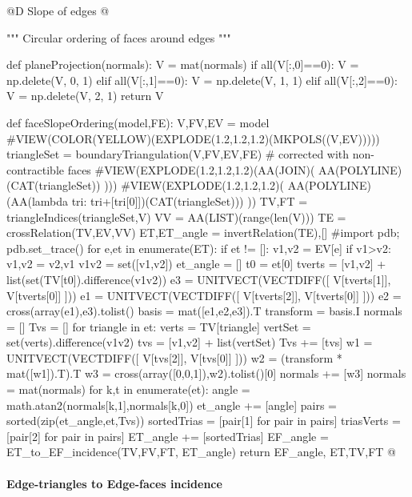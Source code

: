 \documentclass[11pt,oneside]{article}    %
\begin{document}
@D Slope of edges
@{""" Circular ordering of faces around edges """

def planeProjection(normals):
    V = mat(normals)
    if all(V[:,0]==0): V = np.delete(V, 0, 1)
    elif all(V[:,1]==0): V = np.delete(V, 1, 1)
    elif all(V[:,2]==0): V = np.delete(V, 2, 1)
    return V

def faceSlopeOrdering(model,FE):
    V,FV,EV = model
    #VIEW(COLOR(YELLOW)(EXPLODE(1.2,1.2,1.2)(MKPOLS((V,EV)))))
    triangleSet = boundaryTriangulation(V,FV,EV,FE) # corrected with non-contractible faces
    #VIEW(EXPLODE(1.2,1.2,1.2)(AA(JOIN)( AA(POLYLINE)(CAT(triangleSet)) )))
    #VIEW(EXPLODE(1.2,1.2,1.2)( AA(POLYLINE)(AA(lambda tri: tri+[tri[0]])(CAT(triangleSet))) ))
    TV,FT = triangleIndices(triangleSet,V) 
    VV = AA(LIST)(range(len(V)))
    TE = crossRelation(TV,EV,VV)
    ET,ET_angle = invertRelation(TE),[]
    #import pdb; pdb.set_trace()
    for e,et in enumerate(ET):
        if et != []:
            v1,v2 = EV[e]
            if v1>v2: v1,v2 = v2,v1
            v1v2 = set([v1,v2])
            et_angle = []
            t0 = et[0]
            tverts = [v1,v2] + list(set(TV[t0]).difference(v1v2))
            e3 = UNITVECT(VECTDIFF([ V[tverts[1]], V[tverts[0]] ]))
            e1 = UNITVECT(VECTDIFF([ V[tverts[2]], V[tverts[0]] ]))
            e2 = cross(array(e1),e3).tolist()
            basis = mat([e1,e2,e3]).T
            transform = basis.I
            normals = []
            Tvs = []
            for triangle in et:
                verts = TV[triangle]
                vertSet = set(verts).difference(v1v2)
                tvs = [v1,v2] + list(vertSet)
                Tvs += [tvs]
                w1 = UNITVECT(VECTDIFF([ V[tvs[2]], V[tvs[0]] ]))
                w2 = (transform * mat([w1]).T).T
                w3 = cross(array([0,0,1]),w2).tolist()[0]
                normals += [w3]
            normals = mat(normals)
            for k,t in enumerate(et):
                angle = math.atan2(normals[k,1],normals[k,0])
                et_angle += [angle]
            pairs = sorted(zip(et_angle,et,Tvs))
            sortedTrias = [pair[1] for pair in pairs]
            triasVerts = [pair[2] for pair in pairs]
            ET_angle += [sortedTrias]
    EF_angle = ET_to_EF_incidence(TV,FV,FT, ET_angle)
    return EF_angle, ET,TV,FT
@}



\paragraph{Edge-triangles to Edge-faces incidence}
\end{document}
